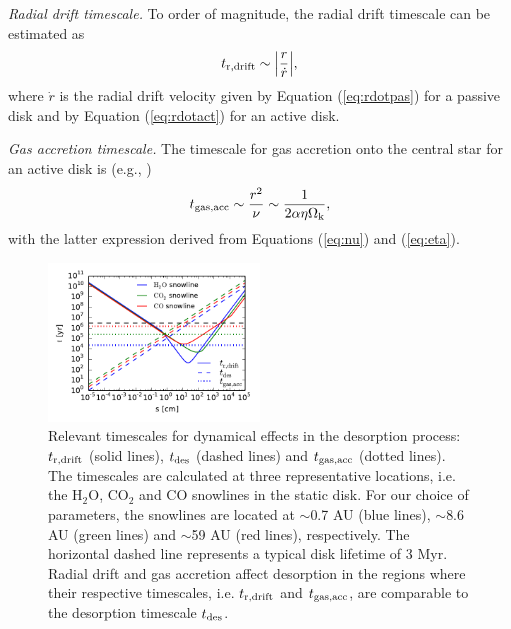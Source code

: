 \documentclass[apj]{emulateapj}
\begin{document}
\textit{Radial drift timescale.} To order of magnitude, the radial drift timescale can be estimated as 
\begin{equation}
\label{eq:tdrift}
t_{\rm r, drift} \sim \Big|\frac{r}{\dot{r}}\Big|,
\end{equation}
where $\dot{r}$ is the radial drift velocity given by Equation (\ref{eq:rdotpas}) for a passive disk and by Equation (\ref{eq:rdotact}) for an active disk.

\textit{Gas accretion timescale.} The timescale for gas accretion onto the central star for an active disk is (e.g., \citealt{armitage10})
\begin{equation}
\label{eq:tgas}
t_{\rm gas, acc} \sim \frac{r^2}{\nu} \sim \frac{1}{2 \alpha \eta \Omega_{\rm k}},
\end{equation}
with the latter expression derived from Equations (\ref{eq:nu}) and (\ref{eq:eta}).

\begin{figure}[h!]
\centering
\includegraphics[width=0.5\textwidth]{../../figs/drift_timescales_betaS1_gas_acc_new.pdf}
\caption{Relevant timescales for dynamical effects in the desorption process: $t_{\rm r, drift}$ (solid lines), $t_{\rm des}$ (dashed lines) and $t_{\rm gas, acc}$ (dotted lines). The timescales are calculated at three representative locations, i.e. the H$_2$O, CO$_2$ and CO snowlines in the static disk. For our choice of parameters, the snowlines are located at $\sim$0.7 AU (blue lines), $\sim$8.6 AU (green lines) and $\sim$59 AU (red lines), respectively. The horizontal dashed line represents a typical disk lifetime of 3 Myr. Radial drift and gas accretion affect desorption in the regions where their respective timescales, i.e. $t_{\rm r, drift}$ and $t_{\rm gas, acc}$, are comparable to the desorption timescale $t_{\rm des}$.} 
\label{fig:timescales}
\end{figure}
\end{document}
